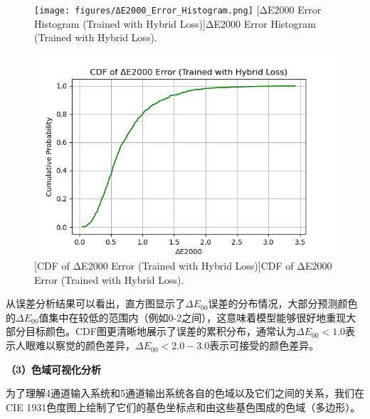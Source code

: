 \begin{figure}[H]
\centering
{}
\texttt{[image: figures/ΔE2000\_Error\_Histogram.png]}
[ΔE2000 Error Histogram (Trained with Hybrid Loss)]{ΔE2000 Error Histogram (Trained with Hybrid Loss).}
\label{figure2: delta_e_histogram}
\end{figure}

\begin{figure}[H]
\centering
{}
\includegraphics[width=0.8\columnwidth]{figures/CDF.png}
[CDF of ΔE2000 Error (Trained with Hybrid Loss)]{CDF of ΔE2000 Error (Trained with Hybrid Loss).}
\label{figure2: delta_e_cdf}
\end{figure}

从误差分析结果可以看出，直方图显示了$\Delta E_{00}$误差的分布情况，大部分预测颜色的$\Delta E_{00}$值集中在较低的范围内（例如0-2之间），这意味着模型能够很好地重现大部分目标颜色。CDF图更清晰地展示了误差的累积分布，通常认为$\Delta E_{00} < 1.0$表示人眼难以察觉的颜色差异，$\Delta E_{00} < 2.0-3.0$表示可接受的颜色差异。

\noindent\textbf{（3）色域可视化分析}

为了理解4通道输入系统和5通道输出系统各自的色域以及它们之间的关系，我们在CIE 1931色度图上绘制了它们的基色坐标点和由这些基色围成的色域（多边形）。

